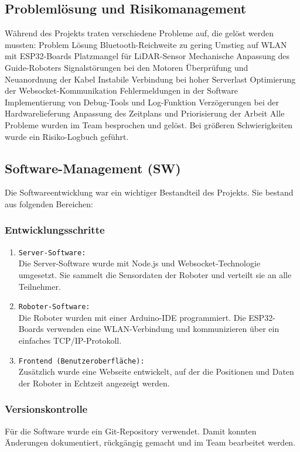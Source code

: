 \subsection{Problemlösung und Risikomanagement}
%
Während des Projekts traten verschiedene Probleme auf, die gelöst werden mussten:
Problem	Lösung
Bluetooth-Reichweite zu gering	Umstieg auf WLAN mit ESP32-Boards
Platzmangel für LiDAR-Sensor	Mechanische Anpassung des Guide-Roboters
Signalstörungen bei den Motoren	Überprüfung und Neuanordnung der Kabel
Instabile Verbindung bei hoher Serverlast	Optimierung der Websocket-Kommunikation
Fehlermeldungen in der Software	Implementierung von Debug-Tools und Log-Funktion
Verzögerungen bei der Hardwarelieferung	Anpassung des Zeitplans und Priorisierung der Arbeit
Alle Probleme wurden im Team besprochen und gelöst. Bei größeren Schwierigkeiten wurde ein Risiko-Logbuch geführt.
\subsection{Software-Management (SW)}
%
Die Softwareentwicklung war ein wichtiger Bestandteil des Projekts. Sie bestand aus folgenden Bereichen:
\subsubsection{Entwicklungsschritte}

\begin{enumerate}
    \item \texttt{Server-Software:} \\
    Die Server-Software wurde mit Node.js und Websocket-Technologie umgesetzt. Sie sammelt die Sensordaten der Roboter und verteilt sie an alle Teilnehmer.
    \item \texttt{Roboter-Software:} \\
    Die Roboter wurden mit einer Arduino-IDE programmiert. Die ESP32-Boards verwenden eine WLAN-Verbindung und kommunizieren über ein einfaches TCP/IP-Protokoll.
    \item \texttt{Frontend (Benutzeroberfläche):} \\
    Zusätzlich wurde eine Webseite entwickelt, auf der die Positionen und Daten der Roboter in Echtzeit angezeigt werden.
  \end{enumerate}
\subsubsection{Versionskontrolle}
Für die Software wurde ein Git-Repository verwendet. Damit konnten Änderungen dokumentiert, rückgängig gemacht und im Team bearbeitet werden.
